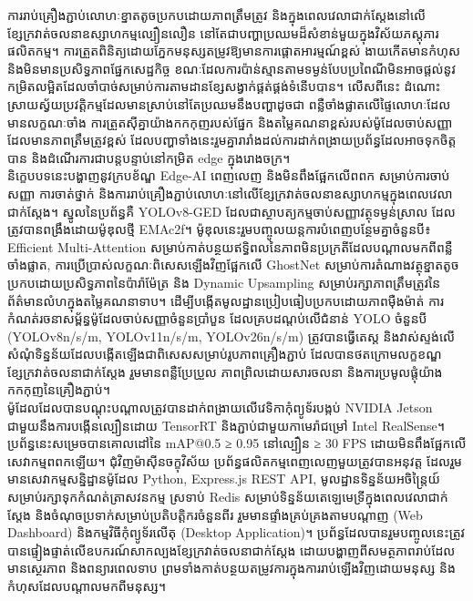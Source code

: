 \begin{khmer}
    
ការរាប់គ្រឿងភ្ជាប់លោហៈខ្នាតតូចប្រកបដោយភាពត្រឹមត្រូវ និងក្នុងពេលវេលាជាក់ស្តែងនៅលើខ្សែក្រវាត់ចលនាឧស្សាហកម្មល្បឿនលឿន នៅតែជាបញ្ហាប្រឈមដ៏សំខាន់មួយក្នុងវិស័យភស្តុភារផលិតកម្ម។ ការត្រួតពិនិត្យដោយភ្នែកមនុស្សតម្រូវឱ្យមានការផ្តោតអារម្មណ៍ខ្ពស់ ងាយកើតមានកំហុស និងមិនមានប្រសិទ្ធភាពផ្នែកសេដ្ឋកិច្ច ខណៈដែលការប៉ាន់ស្មានតាមទម្ងន់បែបប្រពៃណីមិនអាចផ្តល់នូវកម្រិតលម្អិតដែលចាំបាច់សម្រាប់ការតាមដានខ្សែសង្វាក់ផ្គត់ផ្គង់ទំនើបបាន។ លើសពីនេះ ដំណោះស្រាយស្វ័យប្រវត្តិកម្មដែលមានស្រាប់នៅតែប្រឈមនឹងបញ្ហាដូចជា ពន្លឺចាំងផ្លាតលើផ្ទៃលោហៈដែលមានលក្ខណៈចាំង ការត្រួតស៊ីគ្នាយ៉ាងកកកុញរបស់ផ្នែក និងតម្លៃគណនាខ្ពស់របស់ម៉ូដែលចាប់សញ្ញាដែលមានភាពត្រឹមត្រូវខ្ពស់ ដែលបញ្ហាទាំងនេះរួមគ្នារារាំងដល់ការដាក់ពង្រាយប្រព័ន្ធដែលអាចទុកចិត្តបាន និងដំណើរការជាបន្តបន្ទាប់នៅកម្រិត \textenglish{edge} ក្នុងរោងចក្រ។ \\

និក្ខេបបទនេះបង្ហាញនូវក្របខ័ណ្ឌ \textenglish{Edge-AI} ពេញលេញ និងមិនពឹងផ្អែកលើពពក សម្រាប់ការចាប់សញ្ញា ការចាត់ថ្នាក់ និងការរាប់គ្រឿងភ្ជាប់លោហៈនៅលើខ្សែក្រវាត់ចលនាឧស្សាហកម្មក្នុងពេលវេលាជាក់ស្តែង។ ស្នូលនៃប្រព័ន្ធគឺ \textenglish{YOLOv8-GED} ដែលជាស្ថាបត្យកម្មចាប់សញ្ញាវត្ថុទម្ងន់ស្រាល ដែលត្រូវបានពង្រឹងដោយម៉ូឌុលថ្មី \textenglish{EMAc2f}។ ម៉ូឌុលនេះរួមបញ្ចូលយន្តការបំពេញបន្ថែមគ្នាចំនួនបី៖ \textenglish{Efficient Multi-Attention} សម្រាប់កាត់បន្ថយឥទ្ធិពលនៃភាពមិនប្រក្រតីដែលបណ្តាលមកពីពន្លឺចាំងផ្លាត, ការប្រើប្រាស់លក្ខណៈពិសេសឡើងវិញផ្អែកលើ \textenglish{GhostNet} សម្រាប់ការតំណាងវត្ថុខ្នាតតូចប្រកបដោយប្រសិទ្ធភាពនៃប៉ារ៉ាម៉ែត្រ និង \textenglish{Dynamic Upsampling} សម្រាប់រក្សាភាពត្រឹមត្រូវនៃព័ត៌មានលំហក្នុងតម្លៃគណនាទាប។ ដើម្បីបង្កើតមូលដ្ឋានប្រៀបធៀបប្រកបដោយភាពម៉ឺងម៉ាត់ ការកំណត់រចនាសម្ព័ន្ធម៉ូដែលចាប់សញ្ញាចំនួនប្រាំបួន ដែលគ្របដណ្តប់លើជំនាន់ \textenglish{YOLO} ចំនួនបី (\textenglish{YOLOv8n/s/m, YOLOv11n/s/m, YOLOv26n/s/m}) ត្រូវបានធ្វើតេស្ត និងវាស់ស្ទង់លើសំណុំទិន្នន័យដែលបង្កើតឡើងជាពិសេសសម្រាប់រូបភាពគ្រឿងភ្ជាប់ ដែលបានថតក្រោមលក្ខខណ្ឌខ្សែក្រវាត់ចលនាជាក់ស្តែង រួមមានពន្លឺប្រែប្រួល ភាពព្រិលដោយសារចលនា និងការប្រមូលផ្តុំយ៉ាងកកកុញនៃគ្រឿងភ្ជាប់។ \\

ម៉ូដែលដែលបានបណ្តុះបណ្តាលត្រូវបានដាក់ពង្រាយលើវេទិកាកុំព្យូទ័របង្កប់ \textenglish{NVIDIA Jetson} ជាមួយនឹងការបង្កើនល្បឿនដោយ \textenglish{TensorRT} និងភ្ជាប់ជាមួយកាមេរ៉ាជម្រៅ \textenglish{Intel RealSense}។ ប្រព័ន្ធនេះសម្រេចបានគោលដៅនៃ \textenglish{mAP@0.5 ≥ 0.95} នៅល្បឿន \textenglish{≥ 30 FPS} ដោយមិនពឹងផ្អែកលើសេវាកម្មពពកឡើយ។ ជុំវិញម៉ាស៊ីនចក្ខុវិស័យ ប្រព័ន្ធផលិតកម្មពេញលេញមួយត្រូវបានអនុវត្ត ដែលរួមមានសេវាកម្មសន្និដ្ឋានម៉ូដែល \textenglish{Python}, \textenglish{Express.js REST API}, មូលដ្ឋានទិន្នន័យអចិន្ត្រៃយ៍សម្រាប់រក្សាទុកកំណត់ត្រាសវនកម្ម ស្រទាប់ \textenglish{Redis} សម្រាប់ទិន្នន័យតេឡេមេទ្រីក្នុងពេលវេលាជាក់ស្តែង និងចំណុចប្រទាក់សម្រាប់ប្រតិបត្តិករចំនួនពីរ រួមមានផ្ទាំងគ្រប់គ្រងតាមបណ្តាញ (\textenglish{Web Dashboard}) និងកម្មវិធីកុំព្យូទ័រលើតុ (\textenglish{Desktop Application})។ ប្រព័ន្ធដែលបានរួមបញ្ចូលនេះត្រូវបានផ្ទៀងផ្ទាត់លើឧបករណ៍សាកល្បងខ្សែក្រវាត់ចលនាជាក់ស្តែង ដោយបង្ហាញពីសមត្ថភាពរាប់ដែលមានស្ថេរភាព និងពន្យារពេលទាប ព្រមទាំងកាត់បន្ថយតម្រូវការក្នុងការរាប់ឡើងវិញដោយមនុស្ស និងកំហុសដែលបណ្តាលមកពីមនុស្ស។ \\


\end{khmer}
